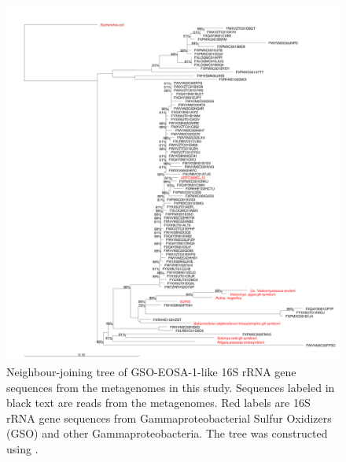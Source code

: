 \begin{figure}[!ht]
  \centering
  \includegraphics[width=\textwidth]{../polarfront/GSO-EOSA-1tree.png}
  \caption[Tree of GSO-EOSA-1 related 16S rRNA genes]{
  Neighbour-joining tree of GSO-EOSA-1-like 16S rRNA gene sequences from the metagenomes in this study.
  Sequences labeled in black text are reads from the metagenomes.
  Red labels are 16S rRNA gene sequences from Gammaproteobacterial Sulfur Oxidizers (GSO) and other Gammaproteobacteria.
  The tree was constructed using  \cite{Ludwig:2004dg}.
  }
  \label{fig:GSO-EOSA-1tree}
\end{figure}
\clearpage

